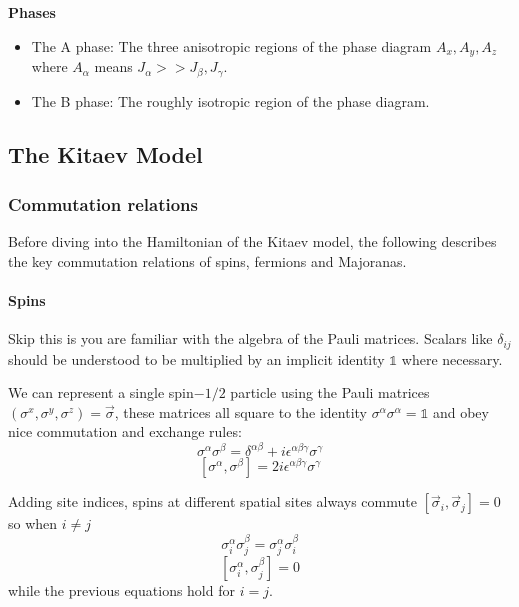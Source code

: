 \textbf{Phases}

\begin{itemize}
\tightlist
\item
  The A phase: The three anisotropic regions of the phase diagram \(A_x, A_y, A_z\) where \(A_\alpha\) means \(J_\alpha >> J_\beta, J_\gamma\).
\item
  The B phase: The roughly isotropic region of the phase diagram.
\end{itemize}

\hypertarget{the-kitaev-model}{%
\subsection{The Kitaev Model}\label{the-kitaev-model}}

\hypertarget{commutation-relations}{%
\subsubsection{Commutation relations}\label{commutation-relations}}

Before diving into the Hamiltonian of the Kitaev model, the following describes the key commutation relations of spins, fermions and Majoranas.

\hypertarget{spins}{%
\paragraph{Spins}\label{spins}}

Skip this is you are familiar with the algebra of the Pauli matrices. Scalars like \(\delta_{ij}\) should be understood to be multiplied by an implicit identity \(\mathbb{1}\) where necessary.

We can represent a single spin\(-1/2\) particle using the Pauli matrices \((\sigma^x, \sigma^y, \sigma^z) = \vec{\sigma}\), these matrices all square to the identity \(\sigma^\alpha \sigma^\alpha = \mathbb{1}\) and obey nice commutation and exchange rules: \[\sigma^\alpha \sigma^\beta = \delta^{\alpha \beta} + i \epsilon^{\alpha \beta \gamma} \sigma^\gamma\] \[[\sigma^\alpha, \sigma^\beta] = 2 i \epsilon^{\alpha \beta \gamma} \sigma^\gamma\]

Adding site indices, spins at different spatial sites always commute \([\vec{\sigma}_i, \vec{\sigma}_j] = 0\) so when \(i \neq j\) \[\sigma_i^\alpha \sigma_j^\beta = \sigma_j^\alpha \sigma_i^\beta\] \[[\sigma_i^\alpha, \sigma_j^\beta] = 0\] while the previous equations hold for \(i = j\).


